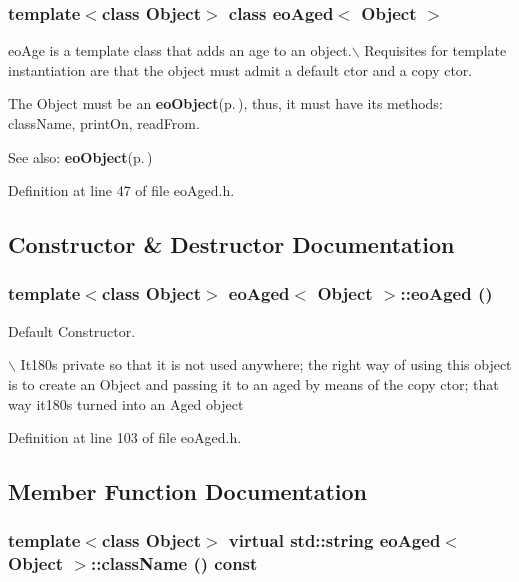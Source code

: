 \subsubsection*{template$<$class Object$>$ class eo\-Aged$<$ Object $>$}

eo\-Age is a template class that adds an age to an object.$\backslash$ Requisites for template instantiation are that the object must admit a default ctor and a copy ctor. 

The Object must be an {\bf eo\-Object}{\rm (p.\,\pageref{classeo_object})}, thus, it must have its methods: class\-Name, print\-On, read\-From. \begin{Desc}
\item[See also:]{\bf eo\-Object}{\rm (p.\,\pageref{classeo_object})} \end{Desc}




Definition at line 47 of file eo\-Aged.h.

\subsection{Constructor \& Destructor Documentation}
\subsubsection{\setlength{\rightskip}{0pt plus 5cm}template$<$class Object$>$ {\bf eo\-Aged}$<$ Object $>$::{\bf eo\-Aged} ()\hspace{0.3cm}{\tt  [inline, private]}}\label{classeo_aged_d0}


Default Constructor. 

$\backslash$ It180s private so that it is not used anywhere; the right way of using this object is to create an Object and passing it to an aged by means of the copy ctor; that way it180s turned into an Aged object 

Definition at line 103 of file eo\-Aged.h.

\subsection{Member Function Documentation}
\subsubsection{\setlength{\rightskip}{0pt plus 5cm}template$<$class Object$>$ virtual std::string {\bf eo\-Aged}$<$ Object $>$::class\-Name () const\hspace{0.3cm}{\tt  [inline, virtual]}}\label{classeo_aged_z9_0}


